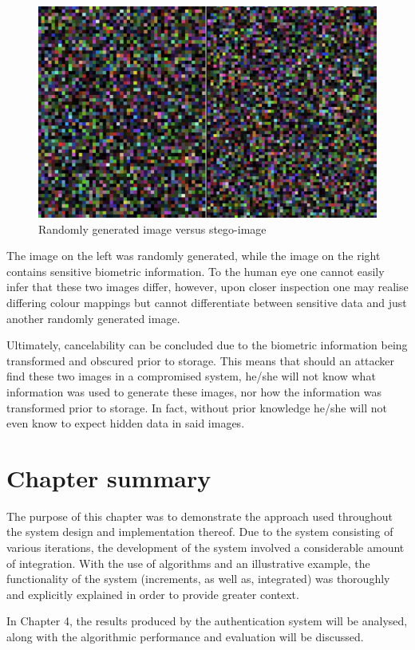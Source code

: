     
    \begin{figure}[htbp!] 
    \centering    
    \includegraphics[width=1.0\textwidth]{Chapter3/Figs/Figure3-7.png}
    \caption[Randomly generated image versus stego-image]{Randomly generated image versus stego-image}
    \label{fig:Randomly generated image versus stego-image}
    \end{figure}

The image on the left was randomly generated, while the image on the right contains sensitive biometric information. To the human eye one cannot easily infer that these two images differ, however, upon closer inspection one may realise differing colour mappings but cannot differentiate between sensitive data and just another randomly generated image.

Ultimately, cancelability can be concluded due to the biometric information being transformed and obscured prior to storage. This means that should an attacker find these two images in a compromised system, he/she will not know what information was used to generate these images, nor how the information was transformed prior to storage. In fact, without prior knowledge he/she will not even know to expect hidden data in said images.

\section{Chapter summary}

The purpose of this chapter was to demonstrate the approach used throughout the system design and implementation thereof. Due to the system consisting of various iterations, the development of the system involved a considerable amount of integration. With the use of algorithms and an illustrative example, the functionality of the system (increments, as well as, integrated) was thoroughly and explicitly explained in order to provide greater context. 

In Chapter 4, the results produced by the authentication system will be analysed, along with the algorithmic performance and evaluation will be discussed.

